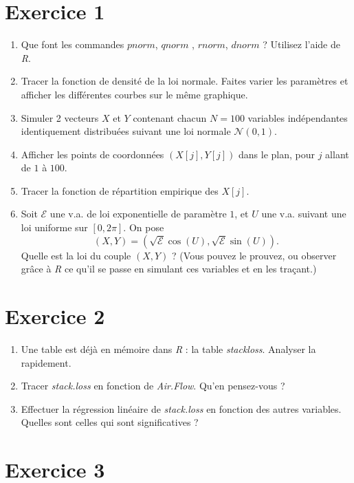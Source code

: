 \section{Exercice 1}
\begin{enumerate}
\item Que font les commandes $pnorm$, $qnorm$ , $rnorm$, $dnorm$ ? Utilisez l'aide de \textit{R}.
\item Tracer la fonction de densité de la loi normale. Faites varier les paramètres et afficher les différentes courbes sur le même graphique. 
\item Simuler 2 vecteurs $X$ et $Y$ contenant chacun $N=100$ variables indépendantes identiquement distribuées suivant une loi normale $\mathcal N (0,1)$.
\item Afficher les points de coordonnées $(X[j],Y[j])$ dans le plan, pour $j$ allant de $1$ à $100$.
\item Tracer la fonction de répartition empirique des $X[j]$.
\item Soit $\mathcal E$ une v.a. de loi exponentielle de paramètre $1$, et $U$ une v.a. suivant une loi uniforme sur $[0,2\pi]$. On pose 
\[(X,Y)=(\sqrt{\mathcal E}\cos (U), \sqrt{\mathcal E} \sin (U)).\]
Quelle est la loi du couple $(X,Y)$ ? (Vous pouvez le prouvez, ou observer grâce à \textit{R} ce qu'il se passe en simulant ces variables et en les traçant.)
\end{enumerate}

\section{Exercice 2}

\begin{enumerate}
\item Une table est déjà en mémoire dans \textit{R} : la table \textit{stackloss}. Analyser la rapidement.
\item Tracer \textit{stack.loss} en fonction de \textit{Air.Flow}. Qu'en pensez-vous ?
\item Effectuer la régression linéaire de \textit{stack.loss} en fonction des autres variables. Quelles sont celles qui sont significatives ?
\end{enumerate}

\section{Exercice 3}

